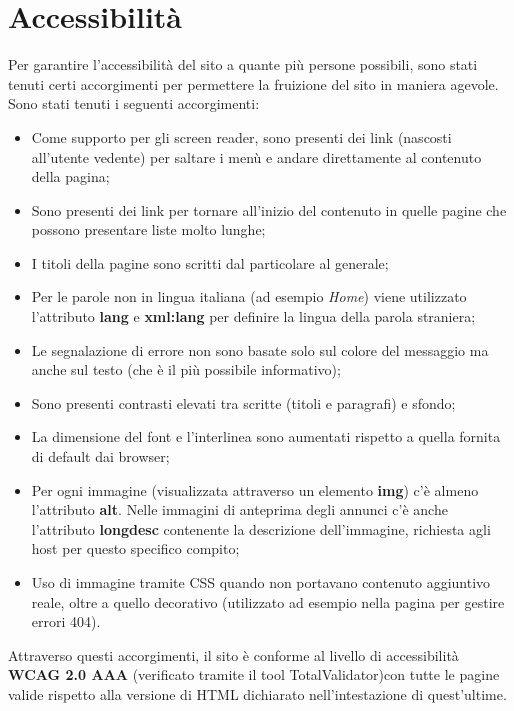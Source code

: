 \documentclass[1_relazione.tex]{subfiles}
\begin{document}
    \section{Accessibilit\`{a}}
    Per garantire l'accessibilità del sito a quante più persone possibili, sono stati tenuti certi accorgimenti per permettere la fruizione del sito in maniera agevole.
    Sono stati tenuti i seguenti accorgimenti:
    \begin{itemize}
        \item Come supporto per gli screen reader, sono presenti dei link (nascosti all'utente vedente) per saltare i men\`{u} e andare direttamente al contenuto della pagina;

        \item Sono presenti dei link per tornare all'inizio del contenuto in quelle pagine che possono presentare liste molto lunghe;

        \item I titoli della pagine sono scritti dal particolare al generale;

        \item Per le parole non in lingua italiana (ad esempio \textit{Home}) viene utilizzato l'attributo \textbf{lang} e \textbf{xml:lang} per definire la lingua della parola straniera;

        \item Le segnalazione di errore non sono basate solo sul colore del messaggio ma anche sul testo (che è il più possibile informativo);

        \item Sono presenti contrasti elevati tra scritte (titoli e paragrafi) e sfondo;

        \item La dimensione del font e l'interlinea sono aumentati rispetto a quella fornita di default dai browser;

        \item Per ogni immagine (visualizzata attraverso un elemento \textbf{img}) c'è almeno l'attributo \textbf{alt}.
        Nelle immagini di anteprima degli annunci c'è anche l'attributo \textbf{longdesc} contenente la descrizione dell'immagine, richiesta agli host per questo specifico compito;

        \item Uso di immagine tramite CSS quando non portavano contenuto aggiuntivo reale, oltre a quello decorativo (utilizzato ad esempio nella pagina per gestire errori 404).

    \end{itemize}
    Attraverso questi accorgimenti, il sito \`{e} conforme al livello di accessibilit\`{a} \textbf{WCAG 2.0 AAA} (verificato tramite il tool TotalValidator)con tutte le pagine valide rispetto alla versione di HTML dichiarato nell'intestazione di quest'ultime.
\end{document}
